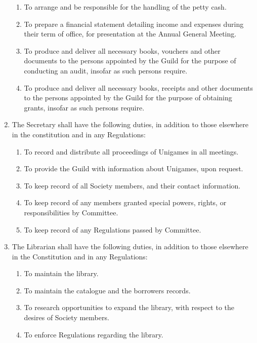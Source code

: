 \documentclass[a4paper]{article}
\begin{document}
\begin{enumerate}
\begin{enumerate}
              \item To arrange and be responsible for the handling of the petty cash.
              \item To prepare a financial statement detailing income and expenses during their term of office, for presentation at the Annual General Meeting.
              \item To produce and deliver all necessary books, vouchers and other documents to the persons appointed by the Guild for the purpose of conducting an audit, insofar as such persons require.
              \item To produce and deliver all necessary books, receipts and other documents to the persons appointed by the Guild for the purpose of obtaining grants, insofar as such persons require.
          \end{enumerate}
    \item The Secretary shall have the following duties, in addition to those elsewhere in the constitution and in any Regulations:
          \begin{enumerate}
              \item To record and distribute all proceedings of Unigames in all meetings.
              \item To provide the Guild with information about Unigames, upon request.
              \item To keep record of all Society members, and their contact information.
              \item To keep record of any members granted special powers, rights, or responsibilities by Committee.
              \item To keep record of any Regulations passed by Committee.
          \end{enumerate}
    \item The Librarian shall have the following duties, in addition to those elsewhere in the Constitution and in any Regulations:
          \begin{enumerate}
              \item To maintain the library.
              \item To maintain the catalogue and the borrowers records.
              \item To research opportunities to expand the library, with respect to the desires of Society members.
              \item To enforce Regulations regarding the library.
          \end{enumerate}

\end{enumerate}
\end{document}
